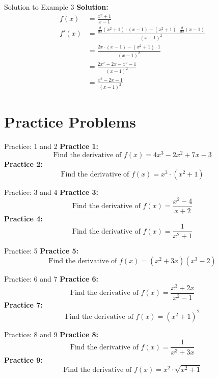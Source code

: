 \documentclass[aspectratio=169]{beamer}
\begin{document}
\begin{frame}{Solution to Example 3}
\textbf{Solution:}
\[
\begin{aligned}
  f(x) &= \frac{x^2 + 1}{x - 1} \\
  f'(x) &= \frac{\frac{d}{dx}(x^2 + 1) \cdot (x-1) - (x^2 + 1) \cdot \frac{d}{dx}(x-1)}{(x-1)^2} \\
  &= \frac{2x \cdot (x-1) - (x^2 + 1) \cdot 1}{(x-1)^2} \\
  &= \frac{2x^2 - 2x - x^2 - 1}{(x-1)^2} \\
  &= \frac{x^2 - 2x - 1}{(x-1)^2}
\end{aligned}
\]
\end{frame}

\section{Practice Problems}

\begin{frame}{Practice: 1 and 2}
\textbf{Practice 1:}
\[
\text{Find the derivative of } f(x) = 4x^3 - 2x^2 + 7x - 3
\]
\vspace{1em}
\textbf{Practice 2:}
\[
\text{Find the derivative of } f(x) = x^3 \cdot (x^2 + 1)
\]
\end{frame}

\begin{frame}{Practice: 3 and 4}
\textbf{Practice 3:}
\[
\text{Find the derivative of } f(x) = \frac{x^2 - 4}{x + 2}
\]
\vspace{1em}
\textbf{Practice 4:}
\[
\text{Find the derivative of } f(x) = \frac{1}{x^2 + 1}
\]
\end{frame}

\begin{frame}{Practice: 5}
\textbf{Practice 5:}
\[
\text{Find the derivative of } f(x) = (x^2 + 3x)(x^3 - 2)
\]
\end{frame}

\begin{frame}{Practice: 6 and 7}
\textbf{Practice 6:}
\[
\text{Find the derivative of } f(x) = \frac{x^3 + 2x}{x^2 - 1}
\]
\vspace{1em}
\textbf{Practice 7:}
\[
\text{Find the derivative of } f(x) = (x^2 + 1)^2
\]
\end{frame}

\begin{frame}{Practice: 8 and 9}
\textbf{Practice 8:}
\[
\text{Find the derivative of } f(x) = \frac{1}{x^3 + 3x}
\]
\vspace{1em}
\textbf{Practice 9:}
\[
\text{Find the derivative of } f(x) = x^2 \cdot \sqrt{x^2 + 1}
\]
\end{frame}
\end{document}
